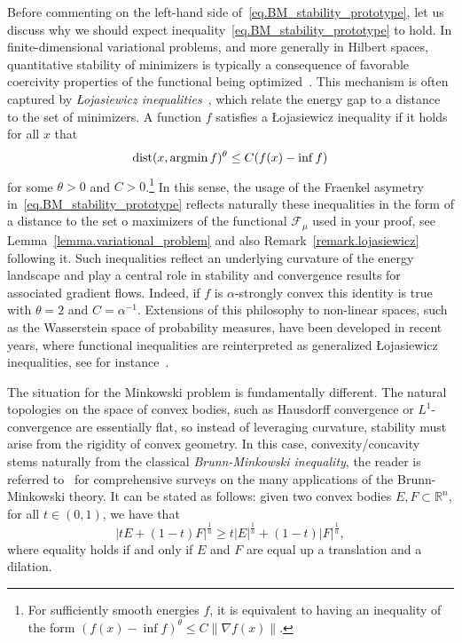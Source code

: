\documentclass[a4paper, 10pt, twoside]{amsart}
\numberwithin{equation}{section}
\theoremstyle{plain}
\theoremstyle{definition}
\begin{document}
Before commenting on the left-hand side of~\eqref{eq.BM_stability_prototype}, let us discuss why we should expect inequality~\eqref{eq.BM_stability_prototype} to hold. In finite-dimensional variational problems, and more generally in Hilbert spaces, quantitative stability of minimizers is typically a consequence of favorable coercivity properties of the functional being optimized~\cite{bonnans2013perturbation}. This mechanism is often captured by \textit{Łojasiewicz inequalities}~\cite{lojasiewicz1965ensembles}, which relate the energy gap to a distance to the set of minimizers. A function 
$f$ satisfies a Łojasiewicz inequality if it holds for all $x$ that
\begin{equation}\label{eq.lojasiewicz_inequalities}
    {\rm dist}(x, \mathop{\rm argmin} f)^\theta 
    \leq  
    C(f(x) - \mathop{\rm inf} f)
\end{equation}
for some $\theta > 0$ and $C>0$.\footnote{
    For sufficiently smooth energies $f$, it is equivalent to having an inequality of the form ${(f(x) - \inf f)}^\theta \leq C \|\nabla f(x)\|$.
} 
In this sense, the usage of the Fraenkel asymetry in~\eqref{eq.BM_stability_prototype} reflects naturally these inequalities in the form of a distance to the set o maximizers of the functional $\mathscr{F}_\mu$ used in your proof, see Lemma~\ref{lemma.variational_problem} and also Remark~\ref{remark.lojasiewicz} following it. Such inequalities reflect an underlying curvature of the energy landscape and play a central role in stability and convergence results for associated gradient flows. Indeed, if $f$ is $\alpha$-strongly convex this identity is true with $\theta = 2$ and $C = \alpha^{-1}$. Extensions of this philosophy to non-linear spaces, such as the Wasserstein space of probability measures, have been developed in recent years, where functional inequalities are reinterpreted as generalized Łojasiewicz inequalities, see for instance~\cite{blanchet2018family}.

The situation for the Minkowski problem is fundamentally different. The natural topologies on the space of convex bodies, such as Hausdorff convergence or $L^1$-convergence are essentially flat, so instead of leveraging curvature, stability must arise from the rigidity of convex geometry. In this case, convexity/concavity stems naturally from the classical \textit{Brunn-Minkowski inequality}, the reader is referred to~\cite{gardner2002brunn,schneider2014covexbodies,boroczky2025isoperimetric} for comprehensive surveys on the many applications of the Brunn-Minkowski theory. It can be stated as follows: given two convex bodies $E,F \subset \mathbb{R}^n$, for all $t \in (0,1)$, we have that
\begin{equation}\label{eq.Brunn-Minkowski}
    {|t E + (1-t)F|}^{\frac{1}{n}} 
    \ge 
    t{|E|}^{\frac{1}{n}} + (1-t){|F|}^{\frac{1}{n}},  
\end{equation}   
where equality holds if and only if $E$ and $F$ are equal up a translation and a dilation.  
\end{document}
